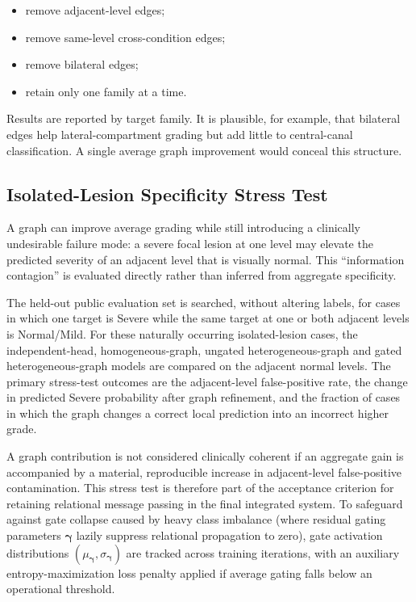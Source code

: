 \begin{itemize}
  \item remove adjacent-level edges;
  \item remove same-level cross-condition edges;
  \item remove bilateral edges;
  \item retain only one family at a time.
\end{itemize}

Results are reported by target family. It is plausible, for example, that
bilateral edges help lateral-compartment grading but add little to central-canal
classification. A single average graph improvement would conceal this structure.

\subsection{Isolated-Lesion Specificity Stress Test}
\label{sec:method-isolated-lesion}

A graph can improve average grading while still introducing a clinically
undesirable failure mode: a severe focal lesion at one level may elevate the
predicted severity of an adjacent level that is visually normal. This
``information contagion'' is evaluated directly rather than inferred from
aggregate specificity.

The held-out public evaluation set is searched, without altering labels, for
cases in which one target is Severe while the same target at one or both
adjacent levels is Normal/Mild. For these naturally occurring isolated-lesion
cases, the independent-head, homogeneous-graph, ungated heterogeneous-graph and
gated heterogeneous-graph models are compared on the adjacent normal levels.
The primary stress-test outcomes are the adjacent-level false-positive rate,
the change in predicted Severe probability after graph refinement, and the
fraction of cases in which the graph changes a correct local prediction into an
incorrect higher grade.

A graph contribution is not considered clinically coherent if an aggregate gain
is accompanied by a material, reproducible increase in adjacent-level
false-positive contamination. This stress test is therefore part of the
acceptance criterion for retaining relational message passing in the final
integrated system. To safeguard against gate collapse caused by heavy class
imbalance (where residual gating parameters $\boldsymbol{\gamma}$ lazily suppress
relational propagation to zero), gate activation distributions
$(\mu_{\boldsymbol{\gamma}}, \sigma_{\boldsymbol{\gamma}})$ are tracked across
training iterations, with an auxiliary entropy-maximization loss penalty applied
if average gating falls below an operational threshold.

